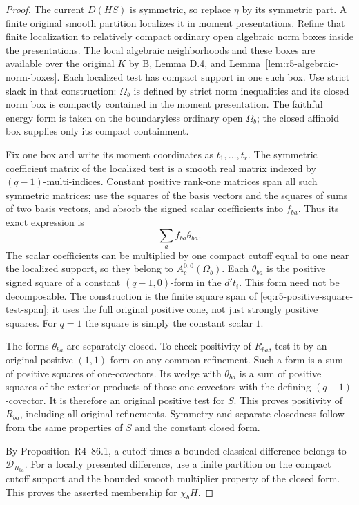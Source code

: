 \documentclass[11pt,a4paper]{article}
\numberwithin{equation}{section}
\theoremstyle{definition}
\theoremstyle{remark}
\begin{document}
\begin{proof}
The current $D(HS)$ is symmetric, so replace $\eta$ by its
symmetric part. A finite original smooth partition localizes
it in moment presentations. Refine that finite localization
to relatively compact ordinary open algebraic norm boxes inside the
presentations. The local algebraic neighborhoods and these
boxes are available over the original $K$ by B, Lemma D.4,
and Lemma~\ref{lem:r5-algebraic-norm-boxes}. Each localized
test has compact support in one such box.
Use strict slack in that construction: $\Omega_b$ is defined
by strict norm inequalities and its closed norm box is compactly
contained in the moment presentation. The faithful energy form
is taken on the boundaryless ordinary open $\Omega_b$; the
closed affinoid box supplies only its compact containment.

Fix one box and write its moment coordinates as
$t_1,\ldots,t_r$. The symmetric coefficient matrix of the
localized test is a smooth real matrix indexed by
$(q-1)$-multi-indices. Constant positive rank-one matrices
span all such symmetric matrices: use the squares of the
basis vectors and the squares of sums of two basis vectors,
and absorb the signed scalar coefficients into $f_{ba}$.
Thus its exact expression is
\[
                         \sum_a f_{ba}\theta_{ba}.
\]
The scalar coefficients can be multiplied by one compact
cutoff equal to one near the localized support, so they
belong to $A_c^{0,0}(\Omega_b)$. Each $\theta_{ba}$ is the
positive signed square of a constant $(q-1,0)$-form in the
$d't_i$. This form need not be decomposable. The construction
is the finite square span of
\eqref{eq:r5-positive-square-test-span}; it uses the full
original positive cone, not just strongly positive squares.
For $q=1$ the square is simply the constant scalar $1$.

The forms $\theta_{ba}$ are separately closed. To check
positivity of $R_{ba}$, test it by an original positive
$(1,1)$-form on any common refinement. Such a form is a sum
of positive squares of one-covectors. Its wedge with
$\theta_{ba}$ is a sum of positive squares of the exterior
products of those one-covectors with the defining
$(q-1)$-covector. It is therefore an original positive test
for $S$. This proves positivity of $R_{ba}$, including all
original refinements. Symmetry and separate closedness follow from
the same properties of $S$ and the constant closed form.

By Proposition~\textup{R4--86.1}, a cutoff
times a bounded classical difference belongs to
$\mathscr D_{R_{ba}}$. For a locally presented difference,
use a finite partition on the compact cutoff support and
the bounded smooth multiplier property of the closed form.
This proves the asserted membership for $\chi_bH$.


\end{proof}
\end{document}
